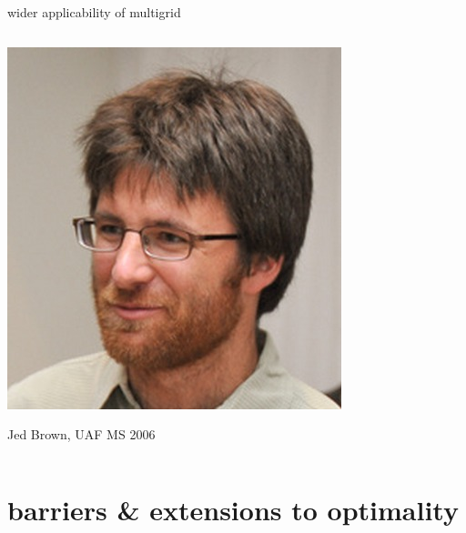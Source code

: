 \documentclass[hide notes,intlimits,usenames,dvipsnames]{beamer}
\begin{document}
\begin{frame}{wider applicability of multigrid}
\begin{columns}
\begin{column}{0.2\textwidth}
\vspace{10mm}
\includegraphics[width=\textwidth]{figs/jed.jpg}

\tiny Jed Brown, UAF MS 2006
\end{column}
\end{columns}
\end{frame}


\section{barriers \& extensions to optimality}
\end{document}
